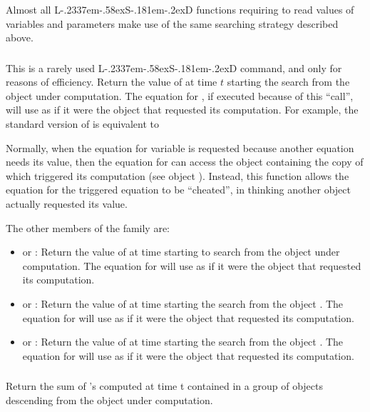 \documentclass [11pt,a4paper] {book}
\def\LsD{{L\kern-.2337em\lower-.58ex\hbox{S}\kern-.181em\lower-.2ex\hbox{D}}\xspace}
\begin{document}
Almost all \LsD functions requiring to read values of variables and parameters make use of
the same searching strategy described above.


\subsubsection{ }

This is a rarely used \LsD command, and only for reasons of efficiency. Return the value of  at time $t$ starting the search from the object under computation. The equation for , if executed because of this ``call'', will use  as if it were the object that requested its computation. For example, the standard version of  is equivalent to  

Normally, when the equation for variable  is requested because another equation
needs its value, then the equation for  can access the object containing the copy
of  which triggered its computation (see object ). Instead, this function
allows the equation for the triggered equation to be ``cheated'', in thinking another
object actually requested its value.

The other members of the family are:
\begin{itemize}
  \item {} or : Return the value of  at time  starting to search from the object under computation. The equation for  will use  as if it were the object that requested its computation.
  \item {} or : Return the value of  at time  starting the search from the object . The equation for  will use  as if it were the object that requested its computation.
  \item {} or : Return the value of  at time  starting the search from the object . The equation for  will use  as if it were the object that requested its computation.
\end{itemize}



\subsubsection{ }
Return the sum of 's computed at time t contained in a group of objects descending
from the object under computation.
\end{document}
